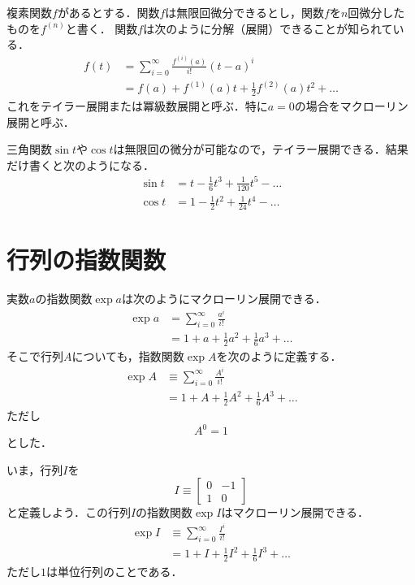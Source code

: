 \documentclass{jsbook}
\begin{document}
複素関数$f$があるとする．関数$f$は無限回微分できるとし，関数$f$を$n$回微分したものを$f^{(n)}$と書く．
関数$f$は次のように分解（展開）できることが知られている．
\begin{align}
f(t)&=\sum_{i=0}^\infty\frac{f^{(i)}(a)}{i!}(t-a)^i\\
&=f(a)+f^{(1)}(a)t+\frac{1}{2}f^{(2)}(a)t^2+\dots
\end{align}
これをテイラー展開または冪級数展開と呼ぶ．特に$a=0$の場合をマクローリン展開と呼ぶ．

三角関数$\sin t$や$\cos t$は無限回の微分が可能なので，テイラー展開できる．結果だけ書くと次のようになる．
\begin{align}
\sin t&=t-\frac{1}{6}t^3+\frac{1}{120}t^5-\dots\\
\cos t&=1-\frac{1}{2}t^2+\frac{1}{24}t^4-\dots
\end{align}

\section{行列の指数関数}

実数$a$の指数関数$\exp a$は次のようにマクローリン展開できる．
\begin{align}
\exp a&=\sum_{i=0}^\infty\frac{a^i}{i!}\\
&=1+a+\frac{1}{2}a^2+\frac{1}{6}a^3+\dots
\end{align}
そこで行列$A$についても，指数関数$\exp A$を次のように定義する．
\begin{align}
\exp A&\equiv\sum_{i=0}^\infty\frac{A^i}{i!}\\
&=1+A+\frac{1}{2}A^2+\frac{1}{6}A^3+\dots
\end{align}
ただし
\begin{equation}
A^0=1
\end{equation}
とした．

いま，行列$I$を
\begin{equation}
I\equiv\begin{bmatrix}0&-1\\1&0\end{bmatrix}
\end{equation}
と定義しよう．この行列$I$の指数関数$\exp I$はマクローリン展開できる．
\begin{align}
\exp I&\equiv\sum_{i=0}^\infty\frac{I^i}{i!}\\
&=1+I+\frac{1}{2}I^2+\frac{1}{6}I^3+\dots
\end{align}
ただし$1$は単位行列のことである．
\end{document}
